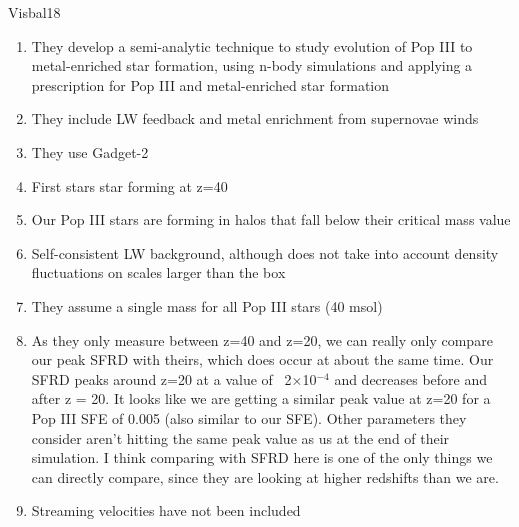 \documentclass[a4paper,fleqn,usenatbib]{mnras}
\begin{document}
\li Visbal18
\begin{enumerate}
	\item They develop a semi-analytic technique to study evolution of Pop III to metal-enriched star formation, using n-body simulations and applying a prescription for Pop III and metal-enriched star formation
	\item They include LW feedback and metal enrichment from supernovae winds
	\item They use Gadget-2
	\item First stars star forming at z=40
	\item Our Pop III stars are forming in halos that fall below their critical mass value 
	\item Self-consistent LW background, although does not take into account density fluctuations on scales larger than the box
	\item They assume a single mass for all Pop III stars (40 msol)
	\item As they only measure between z=40 and z=20, we can really only compare our peak SFRD with theirs, which does occur at about the same time. Our SFRD peaks around z=20 at a value of ~2$\times$10$^{-4}$ and decreases before and after z = 20. It looks like we are getting a similar peak value at z=20 for a Pop III SFE of 0.005 (also similar to our SFE). Other parameters they consider aren't hitting the same peak value as us at the end of their simulation. I think comparing with SFRD here is one of the only things we can directly compare, since they are looking at higher redshifts than we are. 
	\item Streaming velocities have not been included
\end{enumerate}
\end{document}
